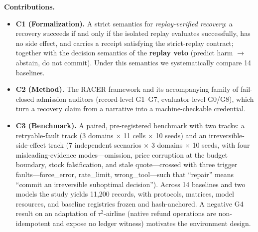 \documentclass[10pt]{article}
\begin{document}
\textbf{Contributions.}

\begin{itemize}

  \item \textbf{C1 (Formalization).} A strict semantics for \emph{replay-verified recovery}: a recovery succeeds if and only if the isolated replay evaluates successfully, has no side effect, and carries a receipt satisfying the strict-replay contract; together with the decision semantics of the \textbf{replay veto} (predict harm $\to$ abstain, do not commit). Under this semantics we systematically compare 14 baselines.

  \item \textbf{C2 (Method).} The RACER framework and its accompanying family of fail-closed admission auditors (record-level G1--G7, evaluator-level G0/G8), which turn a recovery claim from a narrative into a machine-checkable credential.

  \item \textbf{C3 (Benchmark).} A paired, pre-registered benchmark with two tracks: a retryable-fault track (3 domains $\times$ 11 cells $\times$ 10 seeds) and an irreversible-side-effect track (7 independent scenarios $\times$ 3 domains $\times$ 10 seeds, with four misleading-evidence modes---omission, price corruption at the budget boundary, stock falsification, and stale quote---crossed with three trigger faults---force\_error, rate\_limit, wrong\_tool---such that ``repair'' means ``commit an irreversible suboptimal decision''). Across 14 baselines and two models the study yields 11,200 records, with protocols, matrices, model resources, and baseline registries frozen and hash-anchored. A negative G4 result on an adaptation of $\tau^{2}$-airline (native refund operations are non-idempotent and expose no ledger witness) motivates the environment design.


\end{itemize}
\end{document}
